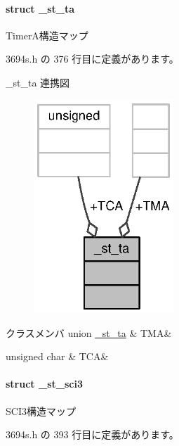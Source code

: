 \paragraph{struct \+\_\+st\+\_\+ta}
Timer\+A構造マップ 

 3694s.\+h の 376 行目に定義があります。



\+\_\+st\+\_\+ta 連携図
\nopagebreak
\begin{figure}[H]
\begin{center}
\leavevmode
\includegraphics[width=149pt]{dd/d40/struct__st__ta__coll__graph}
\end{center}
\end{figure}
\begin{DoxyFields}{クラスメンバ}
union \hyperlink{3694s_8h_db/dee/union__st__ta_8TMA}{\+\_\+st\+\_\+ta}\label{3694s_8h_a50189d56cb0abb7a5898d3af35e041ea}
&
T\+M\+A&
\\
\hline

unsigned char\label{3694s_8h_ace728b52a1e07efa6f9356c3c766d77d}
&
T\+C\+A&
\\
\hline

\end{DoxyFields}
\label{struct__st__sci3}
\paragraph{struct \+\_\+st\+\_\+sci3}
S\+C\+I3構造マップ 

 3694s.\+h の 393 行目に定義があります。



